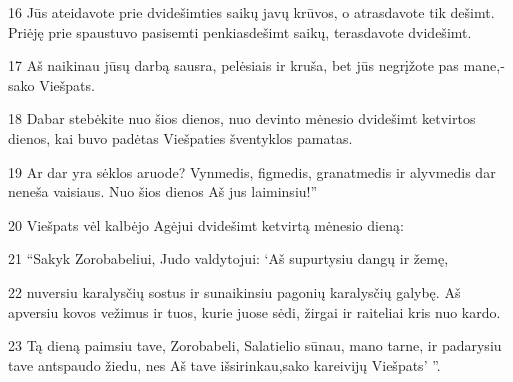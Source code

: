 \par 16 Jūs ateidavote prie dvidešimties saikų javų krūvos, o atrasdavote tik dešimt. Priėję prie spaustuvo pasisemti penkiasdešimt saikų, terasdavote dvidešimt. 
\par 17 Aš naikinau jūsų darbą sausra, pelėsiais ir kruša, bet jūs negrįžote pas mane,­sako Viešpats.­ 
\par 18 Dabar stebėkite nuo šios dienos, nuo devinto mėnesio dvidešimt ketvirtos dienos, kai buvo padėtas Viešpaties šventyklos pamatas. 
\par 19 Ar dar yra sėklos aruode? Vynmedis, figmedis, granatmedis ir alyvmedis dar neneša vaisiaus. Nuo šios dienos Aš jus laiminsiu!” 
\par 20 Viešpats vėl kalbėjo Agėjui dvidešimt ketvirtą mėnesio dieną: 
\par 21 “Sakyk Zorobabeliui, Judo valdytojui: ‘Aš supurtysiu dangų ir žemę, 
\par 22 nuversiu karalysčių sostus ir sunaikinsiu pagonių karalysčių galybę. Aš apversiu kovos vežimus ir tuos, kurie juose sėdi, žirgai ir raiteliai kris nuo kardo. 
\par 23 Tą dieną paimsiu tave, Zorobabeli, Salatielio sūnau, mano tarne, ir padarysiu tave antspaudo žiedu, nes Aš tave išsirinkau,­sako kareivijų Viešpats’ ”.



